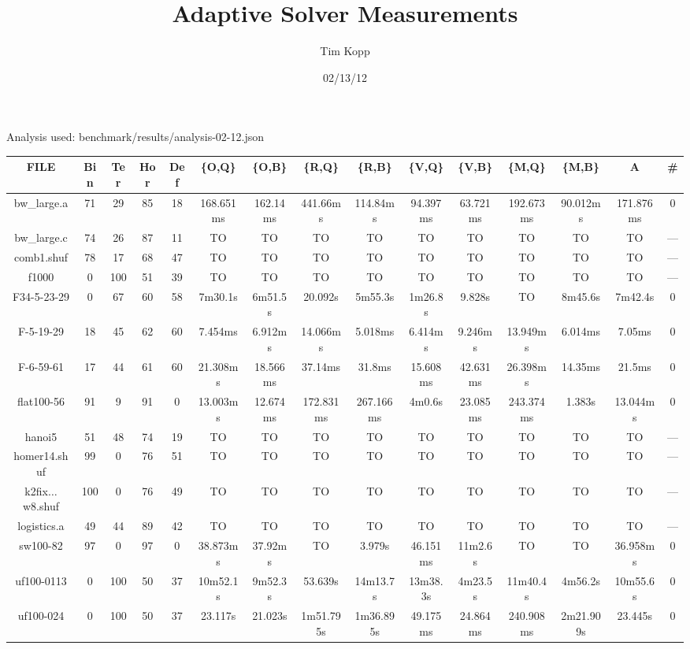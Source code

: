 \documentclass{article}
\title{Adaptive Solver Measurements}
\author{Tim Kopp}
\date{02/13/12}
\begin{document}
\maketitle

Analysis used: benchmark/results/analysis-02-12.json

\begin{table}[ht!]
\centering
\hspace{-0.5in}
\begin{tabular}{|c||c|c|c|c||c|c|c|c|c|c|c|c||c|c|}\hline
FILE & Bin & Ter & Hor & Def & \{O,Q\} & \{O,B\} & \{R,Q\} & \{R,B\} & \{V,Q\} & \{V,B\} & \{M,Q\} & \{M,B\} & A & \#\\\hline\hline
bw\_large.a & 71 & 29 & 85 & 18 & 168.651ms & 162.14ms & 441.66ms & 114.84ms & 94.397ms & 63.721ms & 192.673ms & 90.012ms & 171.876ms & 0\\\hline
bw\_large.c & 74 & 26 & 87 & 11 & TO & TO & TO & TO & TO & TO & TO & TO & TO & --- \\\hline
comb1.shuf & 78 & 17 & 68 & 47 & TO & TO & TO & TO & TO & TO & TO & TO & TO & --- \\\hline
f1000 & 0 & 100 & 51 & 39 & TO & TO & TO & TO & TO & TO & TO & TO & TO & --- \\\hline
F34-5-23-29 & 0 & 67 & 60 & 58 & 7m30.1s & 6m51.5s & 20.092s & 5m55.3s & 1m26.8s & 9.828s & TO & 8m45.6s & 7m42.4s & 0\\\hline
F-5-19-29 & 18 & 45 & 62 & 60 & 7.454ms & 6.912ms & 14.066ms & 5.018ms & 6.414ms & 9.246ms & 13.949ms & 6.014ms & 7.05ms & 0\\\hline
F-6-59-61 & 17 & 44 & 61 & 60 & 21.308ms & 18.566ms & 37.14ms & 31.8ms & 15.608ms & 42.631ms & 26.398ms & 14.35ms & 21.5ms & 0\\\hline
flat100-56 & 91 & 9 & 91 & 0 & 13.003ms & 12.674ms & 172.831ms & 267.166ms & 4m0.6s & 23.085ms & 243.374ms & 1.383s & 13.044ms & 0\\\hline
hanoi5 & 51 & 48 & 74 & 19 & TO & TO & TO & TO & TO & TO & TO & TO & TO & --- \\\hline
homer14.shuf & 99 & 0 & 76 & 51 & TO & TO & TO & TO & TO & TO & TO & TO & TO & --- \\\hline
k2fix$\dots$w8.shuf & 100 & 0 & 76 & 49 & TO & TO & TO & TO & TO & TO & TO & TO & TO & --- \\\hline
logistics.a & 49 & 44 & 89 & 42 & TO & TO & TO & TO & TO & TO & TO & TO & TO & --- \\\hline
sw100-82 & 97 & 0 & 97 & 0 & 38.873ms & 37.92ms & TO & 3.979s & 46.151ms & 11m2.6s & TO & TO & 36.958ms & 0\\\hline
uf100-0113 & 0 & 100 & 50 & 37 & 10m52.1s & 9m52.3s & 53.639s & 14m13.7s & 13m38.3s & 4m23.5s & 11m40.4s & 4m56.2s & 10m55.6s & 0\\\hline
uf100-024 & 0 & 100 & 50 & 37 & 23.117s & 21.023s & 1m51.795s & 1m36.895s & 49.175ms & 24.864ms & 240.908ms & 2m21.909s & 23.445s & 0\\\hline
\end{tabular}
\end{table}
\end{document}
